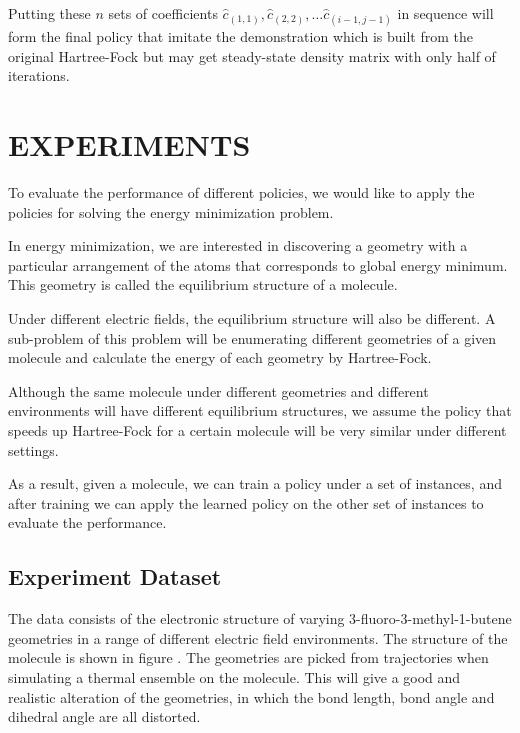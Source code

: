 \documentclass[twoside]{article}
\begin{document}
% 
Putting these $n$ sets of coefficients $\hat{c}_{(1,1)}, \hat{c}_{(2,2)}, \ldots  \hat{c}_{(i-1,j-1)}$ in sequence will form the final policy that imitate the demonstration which is built from  the original Hartree-Fock but may get steady-state density matrix with only half of iterations. 



\section{EXPERIMENTS}

To evaluate the performance of different policies, we would like to apply the policies for solving the energy minimization problem.

In energy minimization, we are interested in discovering a geometry with a particular arrangement of the atoms that corresponds to global energy minimum. This geometry is called the equilibrium structure of a molecule.

Under different electric fields, the equilibrium structure will also be different. A sub-problem of this problem will be enumerating different geometries of a given molecule and calculate the energy of each geometry by Hartree-Fock. 

 
Although the same molecule under different geometries and different environments will have different equilibrium structures, we assume the policy that speeds up Hartree-Fock for a certain molecule will be very similar under different settings. 

As a result, given a molecule, we can train a policy under a set of instances, and after training we can apply the learned policy on the other set of instances to evaluate the performance. 
 
\subsection{Experiment Dataset}

The data consists of the electronic structure of varying 3-fluoro-3-methyl-1-butene geometries in a range of different electric field environments. The structure of the molecule is shown in figure \cite{fig:molecule}. The geometries are picked from trajectories when simulating a thermal ensemble on the molecule. This will give a good and realistic alteration of the geometries, in which the bond length, bond angle and dihedral angle are all distorted. 
\end{document}
